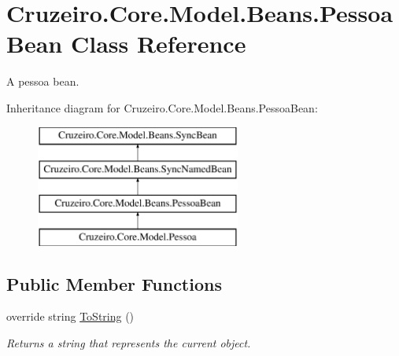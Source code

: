 \hypertarget{class_cruzeiro_1_1_core_1_1_model_1_1_beans_1_1_pessoa_bean}{}\section{Cruzeiro.\+Core.\+Model.\+Beans.\+Pessoa\+Bean Class Reference}
\label{class_cruzeiro_1_1_core_1_1_model_1_1_beans_1_1_pessoa_bean}


A pessoa bean.  


Inheritance diagram for Cruzeiro.\+Core.\+Model.\+Beans.\+Pessoa\+Bean\+:\begin{figure}[H]
\begin{center}
\leavevmode
\includegraphics[height=4.000000cm]{class_cruzeiro_1_1_core_1_1_model_1_1_beans_1_1_pessoa_bean}
\end{center}
\end{figure}
\subsection*{Public Member Functions}
\begin{DoxyCompactItemize}
\item 
override string \hyperlink{class_cruzeiro_1_1_core_1_1_model_1_1_beans_1_1_pessoa_bean_ac6c13dbd22328965d282b36697f06cd3}{To\+String} ()
\begin{DoxyCompactList}\small\item\em Returns a string that represents the current object. \end{DoxyCompactList}\end{DoxyCompactItemize}
